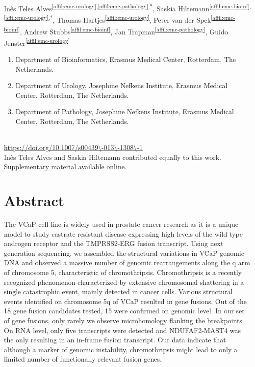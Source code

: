 \setcounter{NAT@ctr}{-1}
Inês Teles Alves\textsuperscript{\ref{affil:emc-urology},\ref{affil:emc-pathology},*},
Saskia Hiltemann\textsuperscript{\ref{affil:emc-bioinf},\ref{affil:emc-urology},*},
Thomas Hartjes\textsuperscript{\ref{affil:emc-urology}},
Peter van der Spek\textsuperscript{\ref{affil:emc-bioinf}},
Andrew Stubbs\textsuperscript{\ref{affil:emc-bioinf}},
Jan Trapman\textsuperscript{\ref{affil:emc-pathology}},
Guido Jenster\textsuperscript{\ref{affil:emc-urology}}

\small
\begin{enumerate}
\itemsep-0.5em
\item Department of Bioinformatics, Erasmus Medical Center, Rotterdam, The Netherlands.\label{affil:emc-bioinf}
\item Department of Urology, Josephine Nefkens Institute, Erasmus Medical Center, Rotterdam, The Netherlands.\label{affil:emc-urology}
\item Department of Pathology, Josephine Nefkens Institute, Erasmus Medical Center, Rotterdam, The Netherlands.\label{affil:emc-pathology}
\end{enumerate}


{\color{chaptergrey}{Published in: Human Genetics}} \\
{\color{chaptergrey}{DOI:}} \url{https://doi.org/10.1007/s00439\-013\-1308\-1} \\
{\color{chaptergrey}{*:}} Inês Teles Alves and Saskia Hiltemann contributed equally to this work.\\
Supplementary material available online. \\

\normalsize

\section*{Abstract}
The VCaP cell line is widely used in prostate cancer research as it is a unique model to study castrate resistant disease expressing high levels of
the wild type androgen receptor and the TMPRSS2-ERG fusion transcript. Using next generation sequencing, we assembled the structural variations in
VCaP genomic DNA and observed a massive number of genomic rearrangements along the q arm of chromosome 5, characteristic of chromothripsis.
Chromothripsis is a recently recognized phenomenon characterized by extensive chromosomal shattering in a single catastrophic event, mainly detected
in cancer cells. Various structural events identified on chromosome 5q of VCaP resulted in gene fusions. Out of the 18 gene fusion candidates tested,
15 were confirmed on genomic level. In our set of gene fusions, only rarely we observe microhomology flanking the breakpoints. On RNA level, only five
transcripts were detected and NDUFAF2-MAST4 was the only resulting in an in-frame fusion transcript. Our data indicate that although a marker of genomic
instability, chromothripsis might lead to only a limited number of functionally relevant fusion genes.


